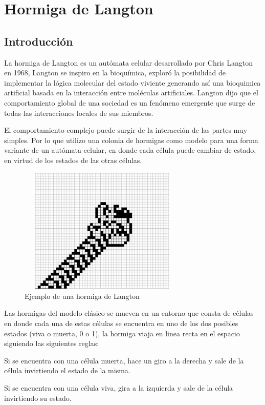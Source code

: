 \section{Hormiga de Langton}
\subsection{Introducción}
La hormiga de Langton es un autómata celular desarrollado por Chris Langton en 1968, Langton se inspiro en la bioquímica, exploró la posibilidad de implementar la lógica molecular del estado viviente generando así una bioquimica artificial basada en la interacción entre moléculas artificiales. Langton dijo que el comportamiento global de una sociedad es un fenómeno emergente que surge de todas las interacciones locales de sus miembros. 

El comportamiento complejo puede surgir de la interacción de las partes muy simples. Por lo que utilizo una colonia de hormigas como modelo para una forma variante de un autómata celular, en donde cada célula puede cambiar de estado, en virtud de los estados de las otras células. \cite{LANGTON}

\begin{figure}[H]
\begin{center}
 \includegraphics[width=8cm, height=6cm]{img/ant.jpg}
 \caption{Ejemplo de una hormiga de Langton}
 \label{fig:ant}
\end{center}
\end{figure}

Las hormigas del modelo clásico se mueven en un entorno que consta de células en donde cada una de estas células se encuentra en uno de los dos posibles estados (viva o muerta, 0 o 1), la hormiga viaja en linea recta en el espacio siguiendo las siguientes reglas:
\begin{description}
 \item Si se encuentra con una célula muerta, hace un giro a la derecha y sale de la célula invirtiendo el estado de la misma.
 \item Si se encuentra con una célula viva, gira a la izquierda y sale de la célula invirtiendo su estado.
\end{description}

